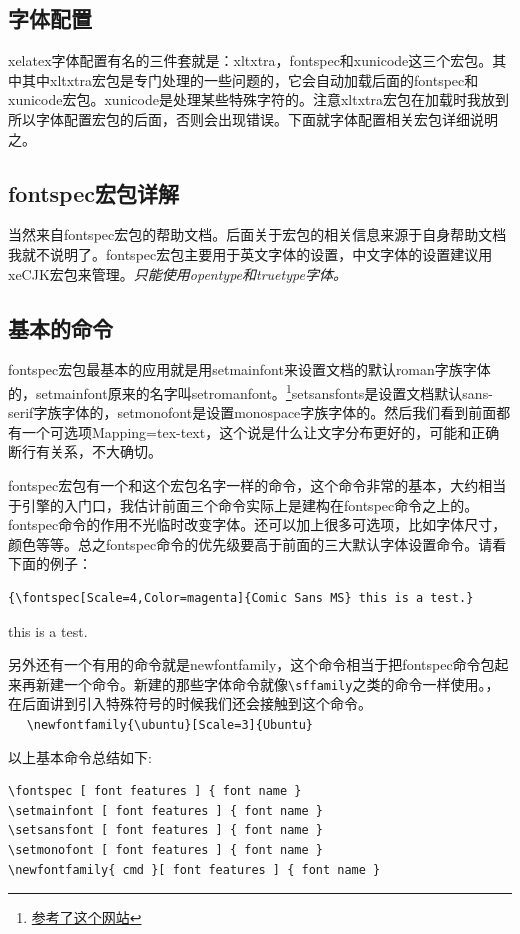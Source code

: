\documentclass[12pt,oneside]{book}
\begin{document}
\begin{common-format}
\section{字体配置}
xelatex字体配置有名的三件套就是：xltxtra，fontspec和xunicode这三个宏包。其中其中xltxtra宏包是专门处理\XeLaTeX 的一些问题的，它会自动加载后面的fontspec和xunicode宏包。xunicode是处理某些特殊字符的。注意xltxtra宏包在加载时我放到所以字体配置宏包的后面，否则会出现错误。下面就字体配置相关宏包详细说明之。


\subsection{fontspec宏包详解}
当然来自fontspec宏包的帮助文档。后面关于宏包的相关信息来源于自身帮助文档我就不说明了。fontspec宏包主要用于英文字体的设置，中文字体的设置建议用xeCJK宏包来管理。\emph{\XeLaTeX 只能使用opentype和truetype字体。}

\subsection{基本的命令}
fontspec宏包最基本的应用就是用setmainfont来设置文档的默认roman字族字体的，setmainfont原来的名字叫setromanfont。\footnote{\href{http://tex.stackexchange.com/questions/70413/problem-with-xetex-latex-and-system-fonts}{参考了这个网站}}setsansfonts是设置文档默认sans-serif字族字体的，setmonofont是设置monospace字族字体的。然后我们看到前面都有一个可选项Mapping=tex-text，这个说是什么让\XeTeX 文字分布更好的，可能和正确断行有关系，不大确切。

fontspec宏包有一个和这个宏包名字一样的命令，这个命令非常的基本，大约相当于引擎的入门口，我估计前面三个命令实际上是建构在fontspec命令之上的。fontspec命令的作用不光临时改变字体。还可以加上很多可选项，比如字体尺寸，颜色等等。总之fontspec命令的优先级要高于前面的三大默认字体设置命令。请看下面的例子：
\begin{Verbatim}
{\fontspec[Scale=4,Color=magenta]{Comic Sans MS} this is a test.} 
\end{Verbatim}
{ this is a test.} 

另外还有一个有用的命令就是newfontfamily，这个命令相当于把fontspec命令包起来再新建一个命令。新建的那些字体命令就像\verb+\sffamily+之类的命令一样使用。，在后面讲到引入特殊符号的时候我们还会接触到这个命令。\\　
\verb+\newfontfamily{\ubuntu}[Scale=3]{Ubuntu}+

以上基本命令总结如下:
\begin{Verbatim}
\fontspec [ font features ] { font name }
\setmainfont [ font features ] { font name }
\setsansfont [ font features ] { font name }
\setmonofont [ font features ] { font name }
\newfontfamily{ cmd }[ font features ] { font name }
\end{Verbatim}


\end{common-format}
\end{document}
